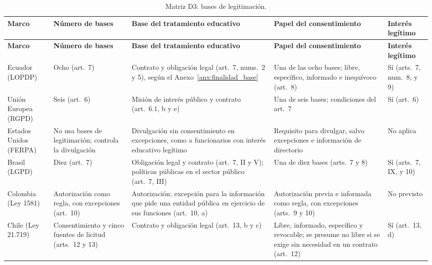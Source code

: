 {\scriptsize
\renewcommand{\arraystretch}{1.12}
\begin{xltabular}{\textwidth}{|>{\raggedright\arraybackslash}p{2.0cm}|L|L|L|L|}
  \caption{Matriz D3: bases de legitimación.}
  \label{tab:matriz_d3} \\
  \hline
  \textbf{Marco} & \textbf{Número de bases} & \textbf{Base del tratamiento educativo} & \textbf{Papel del consentimiento} & \textbf{Interés legítimo} \\
  \hline
  \endfirsthead
  \hline
  \textbf{Marco} & \textbf{Número de bases} & \textbf{Base del tratamiento educativo} & \textbf{Papel del consentimiento} & \textbf{Interés legítimo} \\
  \hline
  \endhead
  \hline
  \endlastfoot
  Ecuador (LOPDP) & Ocho (art.~7) & Contrato y obligación legal (art.~7, nums.~2 y 5), según el Anexo~\ref{anx:finalidad_base} & Una de las ocho bases; libre, específico, informado e inequívoco (art.~8) & Sí (arts.~7, num.~8, y 9) \\ \hline
  Unión Europea (RGPD) & Seis (art.~6) \cite{rgpd2016} & Misión de interés público y contrato (art.~6.1, b y e) \cite{cnil2026superieur} & Una de seis bases; condiciones del art.~7 & Sí (art.~6) \\ \hline
  Estados Unidos (FERPA) & No usa bases de legitimación; controla la divulgación & Divulgación sin consentimiento en excepciones, como a funcionarios con interés educativo legítimo \cite[§~99.31]{ferpa34cfr} & Requisito para divulgar, salvo excepciones e información de directorio \cite{ferpa34cfr} & No aplica \\ \hline
  Brasil (LGPD) & Diez (art.~7) \cite{brasil2018lgpd} & Obligación legal y contrato (art.~7, II y V); políticas públicas en el sector público (art.~7, III) & Una de diez bases (arts.~7 y 8) & Sí (arts.~7, IX, y 10) \\ \hline
  Colombia (Ley 1581) & Autorización como regla, con excepciones (art.~10) & Autorización; excepción para la información que pide una entidad pública en ejercicio de sus funciones (art.~10, a) & Autorización previa e informada como regla, con excepciones (arts.~9 y 10) \cite{colombia2012ley1581} & No previsto \\ \hline
  Chile (Ley 21.719) & Consentimiento y cinco fuentes de licitud (arts.~12 y 13) & Contrato y obligación legal (art.~13, b y c) & Libre, informado, específico y revocable; se presume no libre si se exige sin necesidad en un contrato (art.~12) & Sí (art.~13, d) \\ \hline
\end{xltabular}
}

